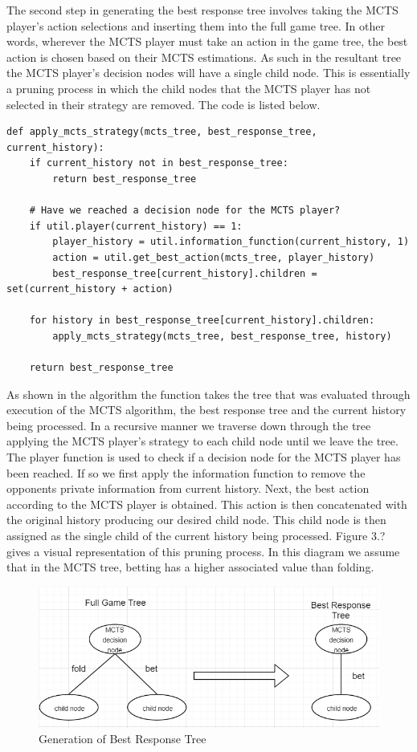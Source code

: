 The second step in generating the best response tree involves taking the MCTS player's action
selections and inserting them into the full game tree\citep{heinrich2017reinforcement}.
In other words, wherever the MCTS player must take an action in the game tree, the best action is chosen
based on their MCTS estimations.
As such in the resultant tree the MCTS player's decision nodes will have
a single child node.
This is essentially a pruning process in which the child nodes that the MCTS player has
not selected in their strategy are removed.
The code is listed below.

\begin{lstlisting}[style=Python]
def apply_mcts_strategy(mcts_tree, best_response_tree, current_history):
    if current_history not in best_response_tree:
        return best_response_tree

    # Have we reached a decision node for the MCTS player?
    if util.player(current_history) == 1:
        player_history = util.information_function(current_history, 1)
        action = util.get_best_action(mcts_tree, player_history)
        best_response_tree[current_history].children = set(current_history + action)

    for history in best_response_tree[current_history].children:
        apply_mcts_strategy(mcts_tree, best_response_tree, history)

    return best_response_tree
\end{lstlisting}

As shown in the algorithm the function takes the tree that was evaluated
through execution of the MCTS algorithm, the best response tree and the current history being processed.
In a recursive manner we traverse down through the tree applying the MCTS player's
strategy to each child node until we leave the tree.
The player function is used to check if a decision node for the MCTS player has been reached.
If so we first apply the information function to remove the opponents private information from current history.
Next, the best action according to the MCTS player is obtained.
This action is then concatenated with the original history producing our desired child node.
This child node is then assigned as the single child of the current history being processed.
Figure 3.? gives a visual representation of this pruning process.
In this diagram we assume that in the MCTS tree, betting has a higher associated value than folding.

\begin{figure}
    \includegraphics[scale=1]{images/best_response_tree_vs_full_tree.PNG}
    \caption{Generation of Best Response Tree}
\end{figure}

